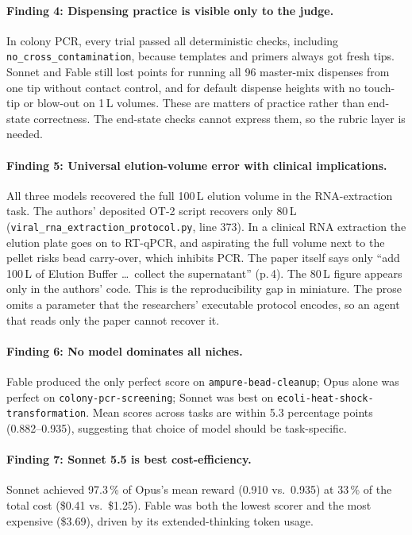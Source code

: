 \documentclass[11pt,a4paper]{article}
\begin{document}
\paragraph{Finding 4: Dispensing practice is visible only to the judge.}
In colony PCR, every trial passed all deterministic checks, including
\texttt{no\_cross\_contamination}, because templates and primers always got
fresh tips.
Sonnet and Fable still lost points for running all 96 master-mix
dispenses from one tip without contact control, and for default dispense
heights with no touch-tip or blow-out on 1\,\textmu L volumes.
These are matters of practice rather than end-state correctness.
The end-state checks cannot express them, so the rubric layer is needed.

\paragraph{Finding 5: Universal elution-volume error with clinical implications.}
All three models recovered the full 100\,\textmu L elution volume in the
RNA-extraction task.
The authors' deposited OT-2 script recovers only 80\,\textmu L
(\texttt{viral\_rna\_extraction\_protocol.py}, line 373).
In a clinical RNA extraction the elution plate goes on to RT-qPCR, and
aspirating the full volume next to the pellet risks bead carry-over, which
inhibits PCR.
The paper itself says only ``add 100\,\textmu L of Elution Buffer \ldots\
collect the supernatant'' (p.\,4).
The 80\,\textmu L figure appears only in the authors' code.
This is the reproducibility gap in miniature.
The prose omits a parameter that the researchers' executable protocol
encodes, so an agent that reads only the paper cannot recover it.

\paragraph{Finding 6: No model dominates all niches.}
Fable produced the only perfect score on \texttt{ampure-bead-cleanup};
Opus alone was perfect on \texttt{colony-pcr-screening};
Sonnet was best on \texttt{ecoli-heat-shock-transformation}.
Mean scores across tasks are within 5.3 percentage points (0.882--0.935),
suggesting that choice of model should be task-specific.

\paragraph{Finding 7: Sonnet 5.5 is best cost-efficiency.}
Sonnet achieved 97.3\,\% of Opus's mean reward (0.910 vs.\ 0.935) at
33\,\% of the total cost (\$0.41 vs.\ \$1.25).
Fable was both the lowest scorer and the most expensive (\$3.69), driven
by its extended-thinking token usage.
\end{document}
